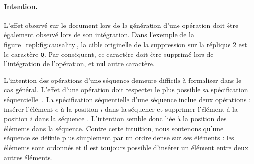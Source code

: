 
\paragraph{Intention.} L'effet observé sur le document lors de la génération
d'une opération doit être également observé lors de son intégration.  Dans
l'exemple de la figure~\ref{repl:fig:causality}, la cible originelle de la
suppression sur la réplique 2 est le caractère \texttt{Q}. Par conséquent, ce
caractère doit être supprimé lors de l'intégration de l'opération, et nul autre
caractère.


\noindent L'intention des opérations d'une séquence demeure difficile à
formaliser dans le cas général. L'effet d'une opération doit respecter le plus
possible sa spécification séquentielle~\cite{bieniusa2012brief}. La
spécification séquentielle d'une séquence inclue deux opérations : \og insérer
l'élément $e$ à la position $i$ dans la séquence \fg et \og supprimer l'élément
à la position $i$ dans la séquence \fg. L'intention semble donc liée à la
position des éléments dans la séquence. Contre cette intuition, nous soutenons
qu'une séquence se définie plus simplement par un ordre dense sur ses éléments :
les éléments sont ordonnés et il est toujours possible d'insérer un élément
entre deux autres éléments.

